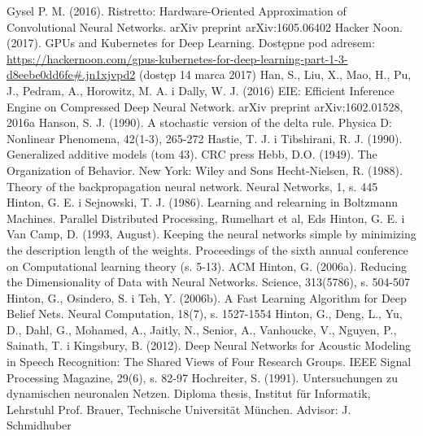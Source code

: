 \documentclass[12pt,a4paper,twoside]{article}
\begin{document}
\begin{thebibliography}{99}
 Gysel P. M. (2016). Ristretto: Hardware-Oriented Approximation of Convolutional Neural Networks. arXiv preprint arXiv:1605.06402
 Hacker Noon. (2017). GPUs and Kubernetes for Deep Learning. Dostępne pod adresem: \url{https://hackernoon.com/gpus-kubernetes-for-deep-learning-part-1-3-d8eebe0dd6fe#.jn1xjvpd2} (dostęp 14 marca 2017)
 Han, S., Liu, X., Mao, H., Pu, J., Pedram, A., Horowitz, M. A. i Dally, W. J. (2016) EIE: Efficient Inference Engine on Compressed Deep Neural Network. arXiv preprint arXiv:1602.01528, 2016a
 Hanson, S. J. (1990). A stochastic version of the delta rule. Physica D: Nonlinear Phenomena, 42(1-3), 265-272
 Hastie, T. J. i Tibshirani, R. J. (1990). Generalized additive models (tom 43). CRC press
 Hebb, D.O. (1949). The Organization of Behavior. New York: Wiley and Sons
 Hecht-Nielsen, R. (1988). Theory of the backpropagation neural network. Neural Networks, 1, s. 445
 Hinton, G. E. i Sejnowski, T. J. (1986). Learning and relearning in Boltzmann Machines. Parallel Distributed Processing, Rumelhart et al, Eds
 Hinton, G. E. i Van Camp, D. (1993, August). Keeping the neural networks simple by minimizing the description length of the weights. Proceedings of the sixth annual conference on Computational learning theory (s. 5-13). ACM
 Hinton, G. (2006a). Reducing the Dimensionality of Data with Neural Networks. Science, 313(5786), s. 504-507
 Hinton, G., Osindero, S. i Teh, Y. (2006b). A Fast Learning Algorithm for Deep Belief Nets. Neural Computation, 18(7), s. 1527-1554
 Hinton, G., Deng, L., Yu, D., Dahl, G., Mohamed, A., Jaitly, N., Senior, A., Vanhoucke, V., Nguyen, P., Sainath, T. i Kingsbury, B. (2012). Deep Neural Networks for Acoustic Modeling in Speech Recognition: The Shared Views of Four Research Groups. IEEE Signal Processing Magazine, 29(6), s. 82-97
 Hochreiter, S. (1991). Untersuchungen zu dynamischen neuronalen Netzen. Diploma thesis, Institut für Informatik, Lehrstuhl Prof. Brauer, Technische Universität München. Advisor: J. Schmidhuber

\end{thebibliography}
\end{document}
